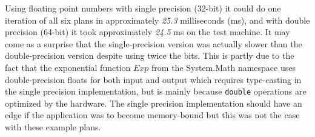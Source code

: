 Using floating point numbers with single precision (32-bit) it could do one iteration of all six plans in approximately \emph{25.3} milliseconds (ms), and with double precision (64-bit) it took approximately \emph{24.5} ms on the test machine.
It may come as a surprise that the single-precision version was actually slower than the double-precision version despite using twice the bits.
This is partly due to the fact that the exponential function $Exp$ from the System.Math namespace uses double-precision floats for both input and output which requires type-casting in the single precision implementation, but is mainly because \lstinline$double$ operations are optimized by the hardware\cite{northrup2008mcts}.
The single precision implementation should have an edge if the application was to become memory-bound but this was not the case with these example plans.